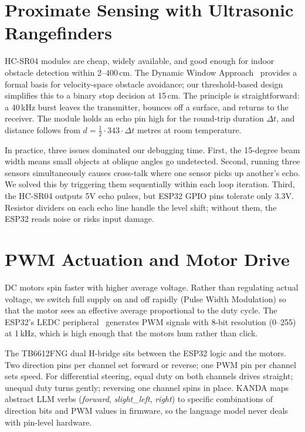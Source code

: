 \section{Proximate Sensing with Ultrasonic Rangefinders}
\label{sec:ultrasonic}

HC-SR04 modules are cheap, widely available, and good enough for indoor obstacle detection within 2--400\,cm. The Dynamic Window Approach~\cite{fox1997dwa} provides a formal basis for velocity-space obstacle avoidance; our threshold-based design simplifies this to a binary stop decision at 15\,cm. The principle is straightforward: a 40\,kHz burst leaves the transmitter, bounces off a surface, and returns to the receiver. The module holds an echo pin high for the round-trip duration $\Delta t$, and distance follows from $d = \frac{1}{2} \cdot 343 \cdot \Delta t$ metres at room temperature.

In practice, three issues dominated our debugging time. First, the 15-degree beam width means small objects at oblique angles go undetected. Second, running three sensors simultaneously causes cross-talk where one sensor picks up another's echo. We solved this by triggering them sequentially within each loop iteration. Third, the HC-SR04 outputs 5V echo pulses, but ESP32 GPIO pins tolerate only 3.3V. Resistor dividers on each echo line handle the level shift; without them, the ESP32 reads noise or risks input damage.

\section{PWM Actuation and Motor Drive}
\label{sec:pwm}

DC motors spin faster with higher average voltage. Rather than regulating actual voltage, we switch full supply on and off rapidly (Pulse Width Modulation) so that the motor sees an effective average proportional to the duty cycle. The ESP32's LEDC peripheral~\cite{espressif2023esp32} generates PWM signals with 8-bit resolution (0--255) at 1\,kHz, which is high enough that the motors hum rather than click.

The TB6612FNG dual H-bridge sits between the ESP32 logic and the motors. Two direction pins per channel set forward or reverse; one PWM pin per channel sets speed. For differential steering, equal duty on both channels drives straight; unequal duty turns gently; reversing one channel spins in place. KANDA maps abstract LLM verbs (\textit{forward}, \textit{slight\_left}, \textit{right}) to specific combinations of direction bits and PWM values in firmware, so the language model never deals with pin-level hardware.

